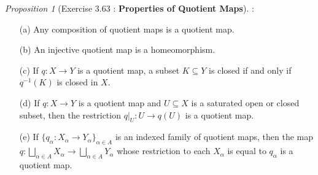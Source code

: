\documentclass[a4paper]{article}
\theoremstyle{remark}
\newtheorem{prop}{Proposition}
\newcommand{\subhim}{\subseteq} %
\begin{document}
\begin{prop}[Exercise 3.63 : \textbf{Properties of Quotient Maps}]:
	\begin{enumerate}[nolistsep]
		\item [(a)] Any composition of quotient maps is a quotient map.
		\item [(b)] An injective quotient map is a homeomorphism.
		\item [(c)] If $q : X \to Y$ is a quotient map, a subset $K \subhim Y$ is closed if and only if $q^{-1}(K)$ is closed in $X$.
		\item [(d)] If $q:X\to Y$ is a quotient map and $U\subhim X$ is a saturated open or closed subset, then the restriction $q|_U : U \to q(U)$ is a quotient map.
		\item [(e)] If $\{q_{\alpha} : X_{\alpha} \to Y_{\alpha} \}_{\alpha \in A}$ is an indexed family of quotient maps, then the map $q:\bigsqcup_{\alpha \in A} X_{\alpha} \to \bigsqcup_{\alpha \in A} Y_{\alpha}$ whose restriction to each $X_{\alpha}$ is equal to $q_{\alpha}$ is a quotient map.
	\end{enumerate}
\end{prop}
\end{document}
